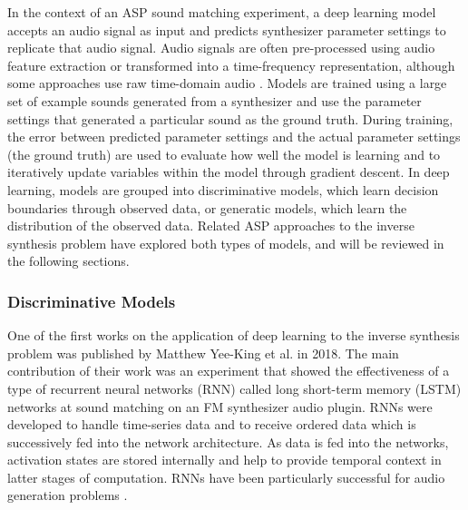 In the context of an ASP sound matching experiment, a deep learning model accepts an audio signal as input and predicts synthesizer parameter settings to replicate that audio signal. Audio signals are often pre-processed using audio feature extraction or transformed into a time-frequency representation, although some approaches use raw time-domain audio \cite{barkan2019inversynth}. Models are trained using a large set of example sounds generated from a synthesizer and use the parameter settings that generated a particular sound as the ground truth. During training, the error between predicted parameter settings and the actual parameter settings (the ground truth) are used to evaluate how well the model is learning and to iteratively update variables within the model through gradient descent. In deep learning, models are grouped into discriminative models, which learn decision boundaries through observed data, or generatic models, which learn the distribution of the observed data. Related ASP approaches to the inverse synthesis problem have explored both types of models, and will be reviewed in the following sections.

\subsubsection{Discriminative Models}
One of the first works on the application of deep learning to the inverse synthesis problem was published by Matthew Yee-King et al. \cite{yee2018automatic} in 2018. The main contribution of their work was an experiment that showed the effectiveness of a type of recurrent neural networks (RNN) called long short-term memory (LSTM) networks at sound matching on an FM synthesizer audio plugin. RNNs were developed to handle time-series data and to receive ordered data which is successively fed into the network architecture. As data is fed into the networks, activation states are stored internally and help to provide temporal context in latter stages of computation. RNNs have been particularly successful for audio generation problems \cite{oord2016wavenet, engel2017neural}. 

